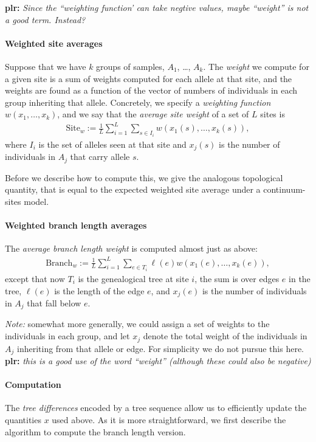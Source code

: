 \documentclass{article}
\newcommand{\branch}{\mbox{Branch}} %
\newcommand{\site}{\mbox{Site}} %
\newcommand{\plr}[1]{{\color{blue}\textbf{plr:} \it #1}}
\begin{document}
\plr{Since the ``weighting function' can take negtive values, maybe ``weight'' is not a good term.  Instead?}

\paragraph{Weighted site averages}
Suppose that we have $k$ groups of samples, $A_1$, \ldots, $A_k$.
The \emph{weight} we compute for a given site is a sum of weights computed for each allele at that site,
and the weights are found as a function of the vector of numbers of individuals in each group inheriting that allele.
Concretely, we specify a \emph{weighting function} $w(x_1, \ldots, x_k)$,
and we say that the \emph{average site weight} of a set of $L$ sites is
\begin{align} \label{eqn:average_site_weight}
    \site_w := \frac{1}{L} \sum_{i=1}^L \sum_{s \in I_i} w(x_1(s), \ldots, x_k(s)) ,
\end{align}
where $I_i$ is the set of alleles seen at that site and
$x_j(s)$ is the number of individuals in $A_j$ that carry allele $s$.

Before we describe how to compute this,
we give the analogous topological quantity,
that is equal to the expected weighted site average
under a continuum-sites model.

\paragraph{Weighted branch length averages}
The \emph{average branch length weight}
is computed almost just as above:
\begin{align} \label{eqn:average_branch_weight}
    \branch_w :=  \frac{1}{L} \sum_{i=1}^L \sum_{e \in T_i} \ell(e) w(x_1(e), \ldots, x_k(e)) ,
\end{align}
except that now $T_i$ is the genealogical tree at site $i$,
the sum is over edges $e$ in the tree, $\ell(e)$ is the length of the edge $e$,
and $x_j(e)$ is the number of individuals in $A_j$ that fall below $e$.

\emph{Note:} somewhat more generally,
we could assign a set of weights to the individuals in each group,
and let $x_j$ denote the total weight of the individuals in $A_j$
inheriting from that allele or edge.
For simplicity we do not pursue this here.
\plr{this is a good use of the word ``weight'' (although these could also be negative)}


\paragraph{Computation}
The \emph{tree differences} encoded by a tree sequence allow us to efficiently update the quantities $x$ used above.
As it is more straightforward, we first describe the algorithm
to compute the branch length version.
\end{document}
